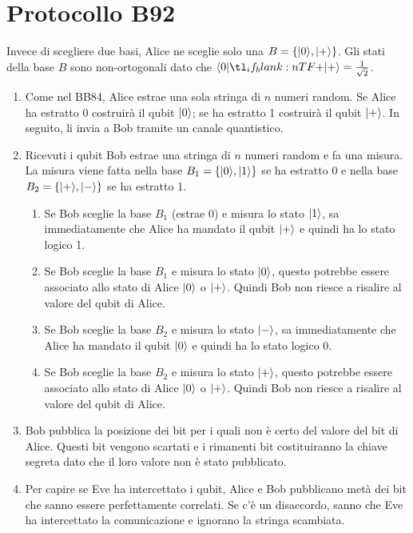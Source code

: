 \documentclass[12pt, a4paper]{report}
\begin{document}
\section{Protocollo B92}
Invece di scegliere due basi, Alice ne sceglie solo una $B=\{| 0 \rangle,| + \rangle\}$. Gli stati della base $B$ sono non-ortogonali dato che $\braket{0}{+}=\frac{1}{\sqrt{2}}$.
\begin{enumerate}
    \item Come nel BB84, Alice estrae una sola stringa di $n$ numeri random. Se Alice ha estratto 0 costruirà il qubit $| 0 \rangle$; se ha estratto 1 costruirà il qubit $| + \rangle$. In seguito, li invia a Bob tramite un canale quantistico.
    \item Ricevuti i qubit Bob estrae una stringa di $n$ numeri random e fa una misura. La misura viene fatta nella base $B_{1}=\{| 0 \rangle,| 1 \rangle\}$ se ha estratto 0 e nella base $B_{2}=\{| + \rangle,| - \rangle\}$ se ha estratto 1. \begin{enumerate}
        \item Se Bob sceglie la base $B_{1}$ (estrae 0) e misura lo stato $| 1 \rangle$, sa immediatamente che Alice ha mandato il qubit $| + \rangle$ e quindi ha lo stato logico 1.
        \item Se Bob sceglie la base $B_{1}$ e misura lo stato $| 0 \rangle$, questo potrebbe essere associato allo stato di Alice $| 0 \rangle$ o $| + \rangle$. Quindi Bob non riesce a risalire al valore del qubit di Alice.
        \item Se Bob sceglie la base $B_{2}$ e misura lo stato $| - \rangle$, sa immediatamente che Alice ha mandato il qubit $| 0 \rangle$ e quindi ha lo stato logico 0.
        \item Se Bob sceglie la base $B_{2}$ e misura lo stato $| + \rangle$, questo potrebbe essere associato allo stato di Alice $| 0 \rangle$ o $| + \rangle$. Quindi Bob non riesce a risalire al valore del qubit di Alice.
    \end{enumerate}
    \item Bob pubblica la posizione dei bit per i quali non è certo del valore del bit di Alice. Questi bit vengono scartati e i rimanenti bit costituiranno la chiave segreta dato che il loro valore non è stato pubblicato.
    \item Per capire se Eve ha intercettato i qubit, Alice e Bob pubblicano metà dei bit che sanno essere perfettamente correlati. Se c'è un disaccordo, sanno che Eve ha intercettato la comunicazione e ignorano la stringa scambiata.
\end{enumerate}
\end{document}
